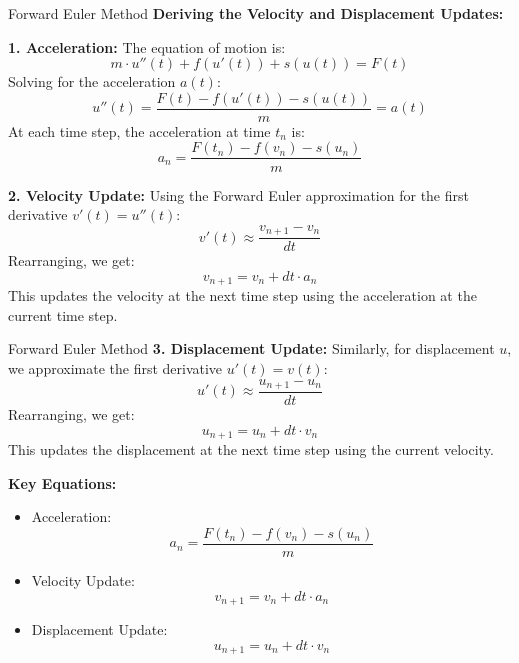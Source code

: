 \documentclass[10pt, aspectratio=54]{beamer}
\begin{document}
\begin{frame}[fragile]{Forward Euler Method}
	\justifying
	\textbf{Deriving the Velocity and Displacement Updates:}
	
	\textbf{1. Acceleration:}
	The equation of motion is:
	\[
	m \cdot u''(t) + f(u'(t)) + s(u(t)) = F(t)
	\]
	Solving for the acceleration \( a(t) \):
	\[
	u''(t) = \frac{F(t) - f(u'(t)) - s(u(t))}{m} = a(t)
	\]
	At each time step, the acceleration at time \( t_n \) is:
	\[
	a_n = \frac{F(t_n) - f(v_n) - s(u_n)}{m}
	\]
	
	\textbf{2. Velocity Update:}
	Using the Forward Euler approximation for the first derivative \( v'(t) = u''(t) \):
	\[
	v'(t) \approx \frac{v_{n+1} - v_n}{dt}
	\]
	Rearranging, we get:
	\[
	v_{n+1} = v_n + dt \cdot a_n
	\]
	This updates the velocity at the next time step using the acceleration at the current time step.
\end{frame}
\begin{frame}[fragile]{Forward Euler Method}
	\justifying
	\textbf{3. Displacement Update:}
	Similarly, for displacement \( u \), we approximate the first derivative \( u'(t) = v(t) \):
	\[
	u'(t) \approx \frac{u_{n+1} - u_n}{dt}
	\]
	Rearranging, we get:
	\[
	u_{n+1} = u_n + dt \cdot v_n
	\]
	This updates the displacement at the next time step using the current velocity.
	
	\textbf{Key Equations:}
	\begin{itemize}
		\item Acceleration:
		\[
		a_n = \frac{F(t_n) - f(v_n) - s(u_n)}{m}
		\]
		\item Velocity Update:
		\[
		v_{n+1} = v_n + dt \cdot a_n
		\]
		\item Displacement Update:
		\[
		u_{n+1} = u_n + dt \cdot v_n
		\]
	\end{itemize}
\end{frame}


%
%	
\end{document}
